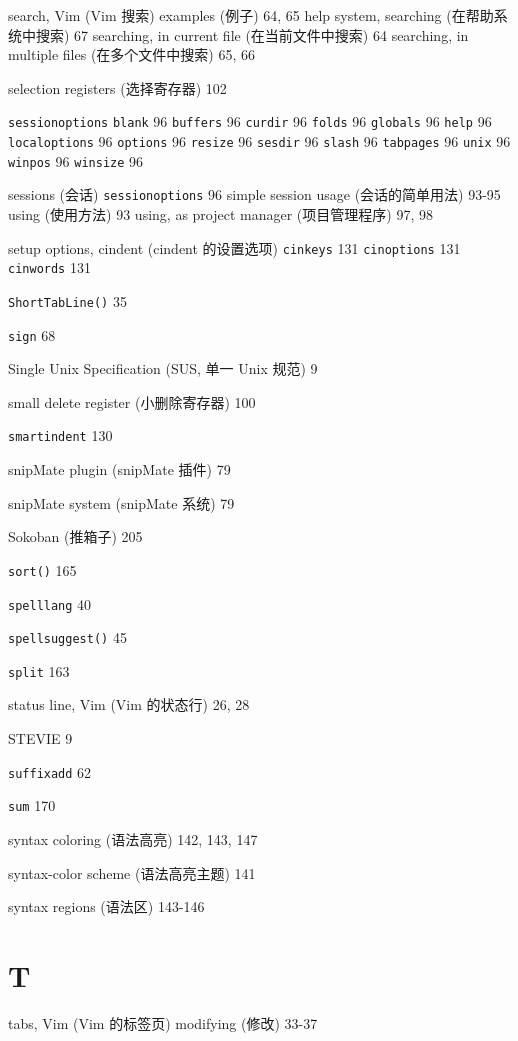 search, Vim (Vim 搜索)
  examples (例子) 64, 65
  help system, searching (在帮助系统中搜索) 67
  searching, in current file (在当前文件中搜索) 64
  searching, in multiple files (在多个文件中搜索) 65, 66

selection registers (选择寄存器) 102

\texttt{sessionoptions}
  \texttt{blank} 96
  \texttt{buffers} 96
  \texttt{curdir} 96
  \texttt{folds} 96
  \texttt{globals} 96
  \texttt{help} 96
  \texttt{localoptions} 96
  \texttt{options} 96
  \texttt{resize} 96
  \texttt{sesdir} 96
  \texttt{slash} 96
  \texttt{tabpages} 96
  \texttt{unix} 96
  \texttt{winpos} 96
  \texttt{winsize} 96

sessions (会话)
  \texttt{sessionoptions} 96
  simple session usage (会话的简单用法) 93-95
  using (使用方法) 93
  using, as project manager (项目管理程序) 97, 98

setup options, cindent (cindent 的设置选项)
  \texttt{cinkeys} 131
  \texttt{cinoptions} 131
  \texttt{cinwords} 131

\texttt{ShortTabLine()} 35

\texttt{sign} 68

Single Unix Specification (SUS, 单一 Unix 规范) 9

small delete register (小删除寄存器) 100

\texttt{smartindent} 130

snipMate plugin (snipMate 插件) 79

snipMate system (snipMate 系统) 79

Sokoban (推箱子) 205

\texttt{sort()} 165

\texttt{spelllang} 40

\texttt{spellsuggest()} 45

\texttt{split} 163

status line, Vim (Vim 的状态行) 26, 28

STEVIE 9

\texttt{suffixadd} 62

\texttt{sum} 170

syntax coloring (语法高亮) 142, 143, 147

syntax-color scheme (语法高亮主题) 141

syntax regions (语法区) 143-146

\section{T}

tabs, Vim (Vim 的标签页)
  modifying (修改) 33-37

